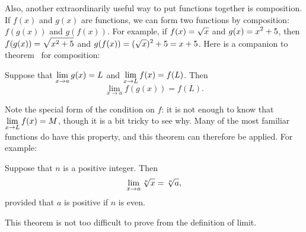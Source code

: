 Also, another extraordinarily useful way to put functions together is
composition. If $f(x)$ and $g(x)$ are
functions, we can form two functions by composition: $f(g(x))$ and
$g(f(x))$. For example, if $\displaystyle f(x)=\sqrt{x}$ and $\displaystyle \displaystyle
g(x)=x^2+5$, then $\displaystyle f(g(x))=\sqrt{x^2+5}$ and $\displaystyle
g(f(x))=(\sqrt{x})^2+5=x+5$.  Here is a companion to
theorem~ for composition:

\begin{theorem} Suppose that $\displaystyle \lim_{x\to a}g(x)=L$ and $\displaystyle \lim_{x\to L}f(x)=f(L)$. Then
$$\lim_{x\to a} f(g(x)) = f(L).$$
\label{thm:limit of composition}
\end{theorem}

Note the special form of the condition on $f$: it is not enough to
know that $\displaystyle\lim_{x\to L}f(x) = M$, though it is a bit tricky to see
why. Many of the most familiar functions do have this property, and
this theorem can therefore be applied. For example:

\begin{theorem} Suppose that $n$ is a positive integer. Then
$$\lim_{x\to a}\root n\of{x} = \root n\of{a},$$
provided that $a$ is positive if $n$ is even.
\label{thm:continuity of roots}
\end{theorem}

This theorem is not too difficult to prove from the definition of limit.








